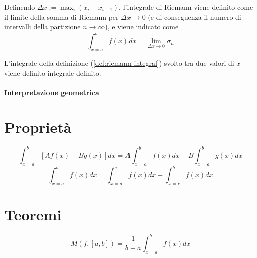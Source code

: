 \begin{definition}\label{def:riemann-integral} Definendo $\Delta x := \max_i(x_i - x_{i-1}) $, l'integrale di Riemann viene definito come il limite della somma di Riemann per $\Delta x  \rightarrow 0$ (e di conseguenza il numero di intervalli della partizione $n \rightarrow \infty$), e viene indicato come
    \begin{equation}
        \int_{x=a}^b f(x) dx = \lim_{\Delta x \rightarrow 0} \sigma_n
    \end{equation}
\end{definition}

\begin{definition} L'integrale della definizione (\ref{def:riemann-integral}) svolto tra due valori di $x$ viene definito integrale definito. 
\end{definition}

\paragraph{Interpretazione geometrica}

\begin{definition}
\end{definition}

\section{Proprietà}
\begin{equation}
    \int_{x=a}^{b} \left[ A f(x) + B g(x) \right] dx = A \int_{x=a}^{b} f(x) dx + B \int_{x=a}^{b} g(x) dx
\end{equation}
\begin{equation}
    \int_{x=a}^{b} f(x) dx = \int_{x=a}^{c} f(x) dx + \int_{x=c}^{b} f(x) dx
\end{equation}

\section{Teoremi}
\begin{definition}[Media]
    \begin{equation}
        M(f, [a,b]) = \dfrac{1}{b-a} \int_{x=a}^{b} f(x) dx
    \end{equation}
\end{definition}

